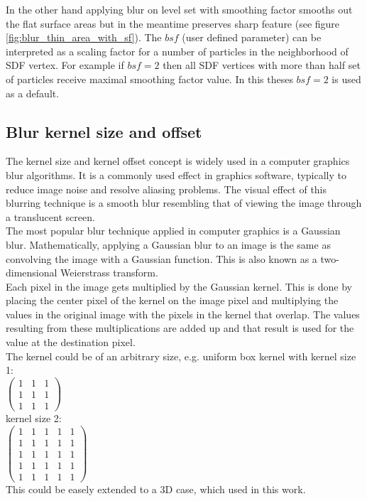 In the other hand applying blur on level set with smoothing factor smooths out the flat surface areas but in the meantime preserves sharp feature (see figure \ref{fig:blur_thin_area_with_sf}). The $bsf$ (user defined parameter) can be interpreted as a scaling factor for a number of particles in the neighborhood of SDF vertex. For example if $bsf=2$ then all SDF vertices with more than half set of particles receive maximal smoothing factor value. In this theses $bsf=2$ is used as a default.
\subsection{Blur kernel size and offset}
The kernel size and kernel offset concept is widely used in a computer graphics blur algorithms. It is a commonly used effect in graphics software, typically to reduce image noise and resolve aliasing problems. The visual effect of this blurring technique is a smooth blur resembling that of viewing the image through a translucent screen.\\
The most popular blur technique applied in computer graphics is a Gaussian blur. Mathematically, applying a Gaussian blur to an image is the same as convolving the image with a Gaussian function. This is also known as a two-dimensional Weierstrass transform.\\
Each pixel in the image gets multiplied by the Gaussian kernel. This is done by placing the center pixel of the kernel on the image pixel and multiplying the values in the original image with the pixels in the kernel that overlap. The values resulting from these multiplications are added up and that result is used for the value at the destination pixel.\\
The kernel could be of an arbitrary size, e.g. uniform box kernel with kernel size 1:\\
$\begin{pmatrix}
1 & 1 & 1\\
1 & 1 & 1\\
1 & 1 & 1
\end{pmatrix}$\\kernel size 2:\\
$\begin{pmatrix}
1 & 1 & 1 & 1 & 1\\
1 & 1 & 1 & 1 & 1\\
1 & 1 & 1 & 1 & 1\\
1 & 1 & 1 & 1 & 1\\
1 & 1 & 1 & 1 & 1
\end{pmatrix}$\\ This could be easely extended to a 3D case, which used in this work.\\
